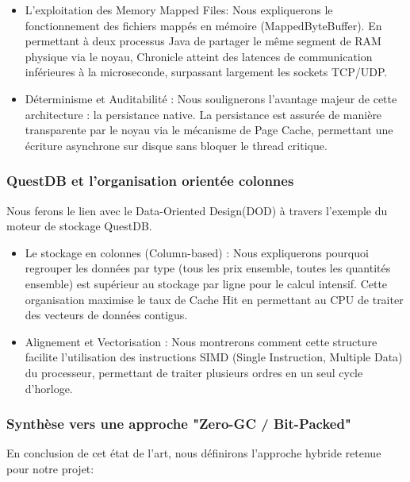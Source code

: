 \begin{itemize}
    \item L'exploitation des Memory Mapped Files: Nous expliquerons le fonctionnement des fichiers mappés en mémoire (MappedByteBuffer). En permettant à deux processus Java de partager le même segment de RAM physique via le noyau, Chronicle atteint des latences de communication inférieures à la microseconde, surpassant largement les sockets TCP/UDP.
    \item Déterminisme et Auditabilité : Nous soulignerons l'avantage majeur de cette architecture : la persistance native. La persistance est assurée de manière transparente par le noyau via le mécanisme de Page Cache, permettant une écriture asynchrone sur disque sans bloquer le thread critique.
\end{itemize}

\subsubsection{QuestDB et l'organisation orientée colonnes}

Nous ferons le lien avec le Data-Oriented Design(DOD) à travers l'exemple du moteur de stockage QuestDB.

\begin{itemize}
    \item Le stockage en colonnes (Column-based) : Nous expliquerons pourquoi regrouper les données par type (tous les prix ensemble, toutes les quantités ensemble) est supérieur au stockage par ligne pour le calcul intensif. Cette organisation maximise le taux de Cache Hit en permettant au CPU de traiter des vecteurs de données contigus.
    \item Alignement et Vectorisation : Nous montrerons comment cette structure facilite l'utilisation des instructions SIMD (Single Instruction, Multiple Data) du processeur, permettant de traiter plusieurs ordres en un seul cycle d'horloge.
\end{itemize}

\subsubsection{Synthèse vers une approche "Zero-GC / Bit-Packed"}

En conclusion de cet état de l'art, nous définirons l'approche hybride retenue pour notre projet:

